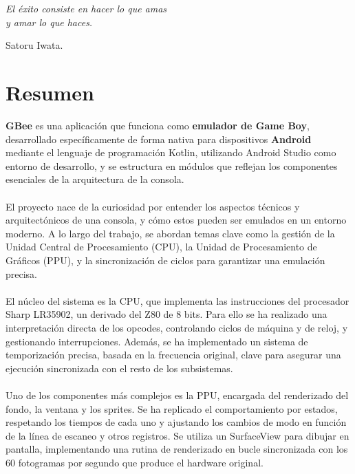 \cleardoublepage %
\chapter*{}
\thispagestyle{empty}
\setlength{\leftmargin}{0.5\textwidth}
\setlength{\parsep}{0cm}
\addtolength{\topsep}{0.5cm}
\begin{flushright}
\small\em{
El éxito consiste en hacer lo que amas\\
y amar lo que haces.
}
\end{flushright}
\begin{flushright}
\small{
Satoru Iwata.
}
\end{flushright}
\cleardoublepage

\chapter*{Resumen}
\label{resumen}
\textbf{GBee} es una aplicación que funciona como \textbf{emulador de Game Boy}, desarrollado específicamente de forma nativa para dispositivos \textbf{Android} mediante el lenguaje de programación Kotlin, utilizando Android Studio como entorno de desarrollo, y se estructura en módulos que reflejan los componentes esenciales de la arquitectura de la consola.
\\\\
El proyecto nace de la curiosidad por entender los aspectos técnicos y arquitectónicos de una consola, y cómo estos pueden ser emulados en un entorno moderno. A lo largo del trabajo, se abordan temas clave como la gestión de la Unidad Central de Procesamiento (CPU), la Unidad de Procesamiento de Gráficos (PPU), y la sincronización de ciclos para garantizar una emulación precisa.
\\\\
El núcleo del sistema es la CPU, que implementa las instrucciones del procesador Sharp LR35902, un derivado del Z80 de 8 bits. Para ello se ha realizado una interpretación directa de los opcodes, controlando ciclos de máquina y de reloj, y gestionando interrupciones. Además, se ha implementado un sistema de temporización precisa, basada en la frecuencia original, clave para asegurar una ejecución sincronizada con el resto de los subsistemas.
\\\\
Uno de los componentes más complejos es la PPU, encargada del renderizado del fondo, la ventana y los sprites. Se ha replicado el comportamiento por estados, respetando los tiempos de cada uno y ajustando los cambios de modo en función de la línea de escaneo y otros registros. Se utiliza un SurfaceView para dibujar en pantalla, implementando una rutina de renderizado en bucle sincronizada con los 60 fotogramas por segundo que produce el hardware original.
